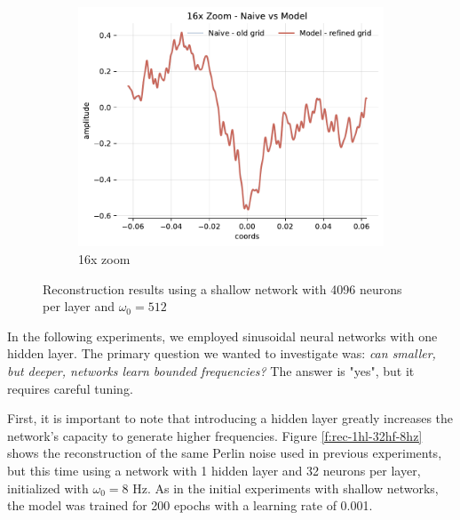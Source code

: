 \begin{figure}[h]
\begin{subfigure}[b]{0.32\textwidth}
        \includegraphics[width=\textwidth]{img/ch3/noise-16x-hf4096-w512.pdf}
        \caption{16x zoom}
    \end{subfigure}
    \caption{Reconstruction results using a shallow network with 4096 neurons per layer and $\omega_0=512$}
    \label{f:full-noise-hf4096-w512}
\end{figure}


In the following experiments, we employed sinusoidal neural networks with one hidden layer. The primary question we wanted to investigate was: \emph{can smaller, but deeper, networks learn bounded frequencies?} The answer is "yes", but it requires careful tuning.

First, it is important to note that introducing a hidden layer greatly increases the network's capacity to generate higher frequencies. Figure \ref{f:rec-1hl-32hf-8hz} shows the reconstruction of the same Perlin noise used in previous experiments, but this time using a network with 1 hidden layer and 32 neurons per layer, initialized with $\omega_0=8$ Hz. As in the initial experiments with shallow networks, the model was trained for 200 epochs with a learning rate of 0.001.

